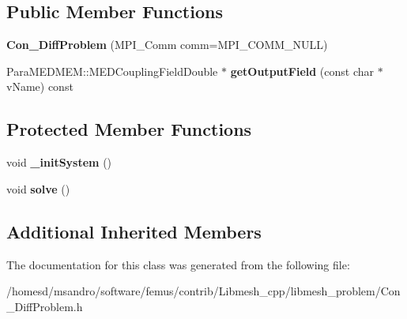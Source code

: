 \subsection*{Public Member Functions}
\begin{DoxyCompactItemize}
\item 
\hypertarget{class_con___diff_problem_a55ec902fe07ef477b00e6c3baee5643d}{{\bfseries Con\-\_\-\-Diff\-Problem} (M\-P\-I\-\_\-\-Comm comm=M\-P\-I\-\_\-\-C\-O\-M\-M\-\_\-\-N\-U\-L\-L)}\label{class_con___diff_problem_a55ec902fe07ef477b00e6c3baee5643d}

\item 
\hypertarget{class_con___diff_problem_ac5abb233beb1a926c303a17532050057}{Para\-M\-E\-D\-M\-E\-M\-::\-M\-E\-D\-Coupling\-Field\-Double $\ast$ {\bfseries get\-Output\-Field} (const char $\ast$v\-Name) const }\label{class_con___diff_problem_ac5abb233beb1a926c303a17532050057}

\end{DoxyCompactItemize}
\subsection*{Protected Member Functions}
\begin{DoxyCompactItemize}
\item 
\hypertarget{class_con___diff_problem_a5087a6509c33681087461ceacc37c3bd}{void {\bfseries \-\_\-init\-System} ()}\label{class_con___diff_problem_a5087a6509c33681087461ceacc37c3bd}

\item 
\hypertarget{class_con___diff_problem_ac8072081699182d4f7189759e8e10e69}{void {\bfseries solve} ()}\label{class_con___diff_problem_ac8072081699182d4f7189759e8e10e69}

\end{DoxyCompactItemize}
\subsection*{Additional Inherited Members}


The documentation for this class was generated from the following file\-:\begin{DoxyCompactItemize}
\item 
/homesd/msandro/software/femus/contrib/\-Libmesh\-\_\-cpp/libmesh\-\_\-problem/Con\-\_\-\-Diff\-Problem.\-h\end{DoxyCompactItemize}
